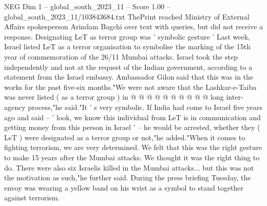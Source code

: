 \begin{textsample}{NEG Dim 1 – global\_south\_2023\_11 – Score 1.00 – global\_south\_2023\_11/103843684.txt}
ThePrint reached Ministry of External Affairs spokesperson Arindam Bagchi over text with queries, but did not receive a response.
Designating LeT as terror group was ' symbolic gesture ' Last week, Israel listed LeT as a terror organisation to symbolise the marking of the 15th year of commemoration of the 26/11 Mumbai attacks.
Israel took the step independently and not at the request of the Indian government, according to a statement from the Israel embassy.
Ambassador Gilon said that this was in the works for the past five-six months."We were not aware that the Lashkar-e-Taiba was never listed ( as a terror group ) in @ @ @ @ @ @ @ @ @ @ long inter-agency process,"he said."It ' s very symbolic.
If India had come to Israel five years ago and said -- ' look, we know this individual from LeT is in communication and getting money from this person in Israel ' -- he would be arrested, whether they ( LeT ) were designated as a terror group or not,"he added."When it comes to fighting terrorism, we are very determined.
We felt that this was the right gesture to make 15 years after the Mumbai attacks.
We thought it was the right thing to do.
There were also six Israelis killed in the Mumbai attacks... but this was not the motivation as such,"he further said.
During the press briefing Tuesday, the envoy was wearing a yellow band on his wrist as a symbol to stand together against terrorism.

\end{textsample}
